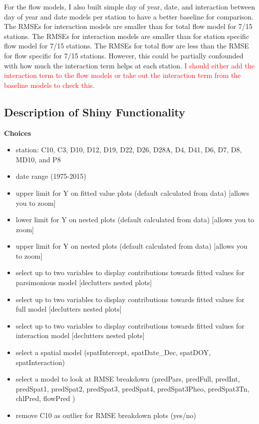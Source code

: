 \documentclass[12pt]{amsart}
\begin{document}

For the flow models, I also built simple day of year, date, and interaction between day of year and date models per station to have a better baseline for comparison.
The RMSEs for interaction models are smaller than for total flow model for 7/15 stations. The RMSEs for interaction models are smaller than for station specific flow model for 7/15 stations.  The RMSEs for total flow are less than the RMSE for flow specific for 7/15 stations.  However, this could be partially confounded with how much the interaction term helps at each station. \textcolor{red}{I should either add the interaction term to the flow models or take out the interaction term from the baseline models to check this.}



\subsection{Description of Shiny Functionality}

\textbf{Choices}
\begin{itemize}
\item station: C10, C3, D10, D12, D19, D22, D26, D28A, D4, D41, D6, D7, D8, MD10, and P8
\item date range (1975-2015)
\item upper limit for Y on fitted value plots (default calculated from data) [allows you to zoom]
\item lower limit for Y on nested plots (default calculated from data) [allows you to zoom]

\item upper limit for Y on nested plots (default calculated from data) [allows you to zoom]

\item select up to two variables to display contributions towards fitted values for parsimonious model [declutters nested plots]
\item select up to two variables to display contributions towards fitted values for full model [declutters nested plots]
\item select up to two variables to display contributions towards fitted values for interaction model [declutters nested plots]
\item select a spatial model (spatIntercept, spatDate_Dec, spatDOY, spatInteraction)
\item select a model to look at RMSE breakdown (predPars, predFull, predInt, predSpat1, predSpat2, predSpat3, predSpat4, predSpat3Pheo, predSpat3Tn, chlPred, flowPred )
\item remove C10 as outlier for RMSE breakdown plots (yes/no)
\end{itemize}
\end{document}
